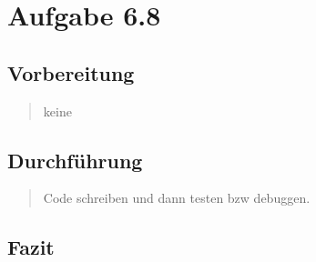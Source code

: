 \section{Aufgabe 6.8}
\subsection{Vorbereitung}
\begin{quote}
	keine
\end{quote}
\subsection{Durchführung}
\begin{quote}
	Code schreiben und dann testen bzw debuggen.
\end{quote}
\subsection{Fazit}
\begin{quote}
	
\end{quote}